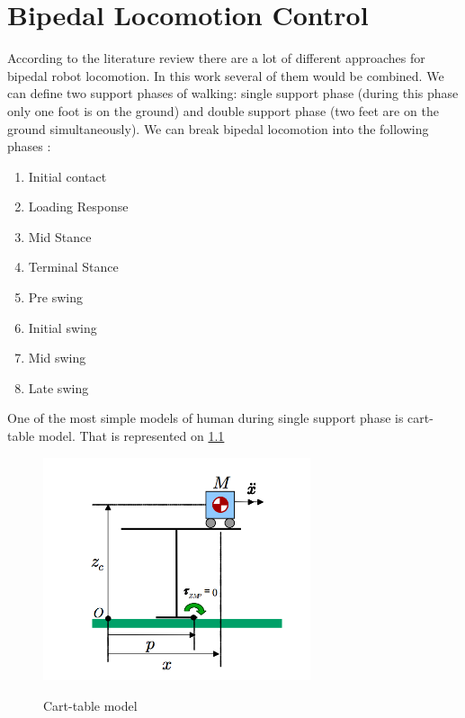 \documentclass[12pt,a4paper]{report}
\begin{document}
		
	\chapter{Bipedal Locomotion Control}
		According to the literature review there are a lot of different approaches for bipedal robot locomotion. In this work several of them would be combined.
		We can define two support phases of walking: single support phase (during this phase only one foot is on the ground) and double support phase (two feet are on the ground simultaneously).
		We can break bipedal locomotion into the following phases \cite{rostami1998impactless}:
		
		\begin{enumerate}
			\item Initial contact
			\item Loading Response
			\item Mid Stance
			\item Terminal Stance
			\item Pre swing
			\item Initial swing
			\item Mid swing
			\item Late swing			
		\end{enumerate}
		
		One of the most simple models of human during single support phase is cart-table model. That is represented on \cref{fig:6}
		
		\begin{figure}[h!]
			\vspace{-0.2cm}
			\centering
			{\includegraphics[width=0.7\textwidth]{6}}
			\caption{Cart-table model \cite{kajita2003biped}}
			\label{fig:6}
			\vspace{-0.1cm}
		\end{figure}
		
\end{document}
